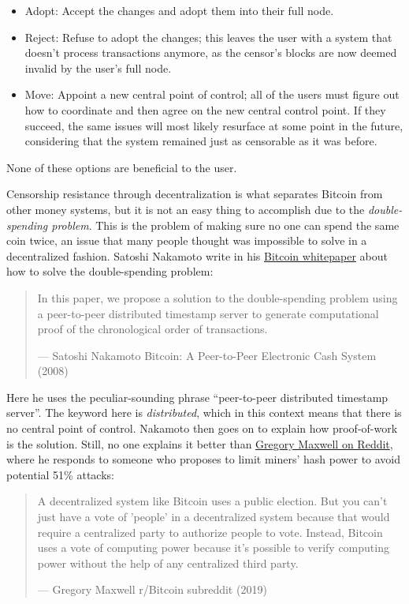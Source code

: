\begin{itemize}
\item
  Adopt: Accept the changes and adopt them into their full node.
\item
  Reject: Refuse to adopt the changes; this leaves the user with a
  system that doesn't process transactions anymore, as the censor's
  blocks are now deemed invalid by the user's full node.
\item
  Move: Appoint a new central point of control; all of the users must
  figure out how to coordinate and then agree on the new central control
  point. If they succeed, the same issues will most likely resurface at
  some point in the future, considering that the system remained just as
  censorable as it was before.
\end{itemize}

None of these options are beneficial to the user.

Censorship resistance through decentralization is what separates Bitcoin
from other money systems, but it is not an easy thing to accomplish due
to the \emph{double-spending problem}. This is the problem of making
sure no one can spend the same coin twice, an issue that many people
thought was impossible to solve in a decentralized fashion. Satoshi
Nakamoto write in his \href{https://bitcoin.org/bitcoin.pdf}{Bitcoin
whitepaper} about how to solve the double-spending problem:

\begin{quote}
In this paper, we propose a solution to the double-spending problem
using a peer-to-peer distributed timestamp server to generate
computational proof of the chronological order of transactions.

---  Satoshi Nakamoto Bitcoin: A Peer-to-Peer Electronic Cash System
(2008)
\end{quote}

Here he uses the peculiar-sounding phrase ``peer-to-peer distributed
timestamp server''. The keyword here is \emph{distributed}, which in
this context means that there is no central point of control. Nakamoto
then goes on to explain how proof-of-work is the solution. Still, no one
explains it better than
\href{https://www.reddit.com/r/Bitcoin/comments/ddddfl/question_on_the_vulnerability_of_bitcoin/f2g9e7b/}{Gregory
Maxwell on Reddit}, where he responds to someone who proposes to limit
miners' hash power to avoid potential 51\% attacks:

\begin{quote}
A decentralized system like Bitcoin uses a public election. But you
can't just have a vote of 'people' in a decentralized system because
that would require a centralized party to authorize people to vote.
Instead, Bitcoin uses a vote of computing power because it's possible to
verify computing power without the help of any centralized third party.

---  Gregory Maxwell r/Bitcoin subreddit (2019)
\end{quote}

